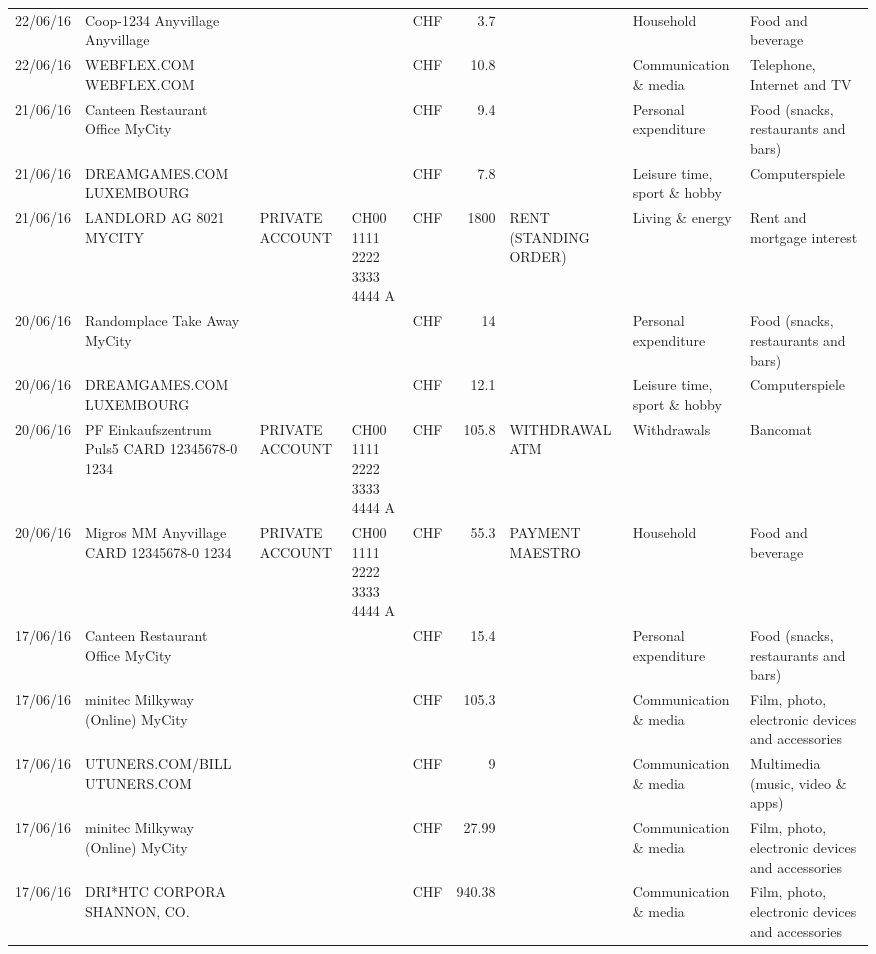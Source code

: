 \begin{landscape}
\begin{table}[h]
\begin{center}
\begin{tabular}{rllllrlll}
		22/06/16 & Coop-1234 Anyvillage    Anyvillage &       &       & CHF   & 3.7   &       & Household & Food and beverage \\
		22/06/16 & WEBFLEX.COM              WEBFLEX.COM &       &       & CHF   & 10.8  &       & Communication \& media & Telephone,  Internet and TV \\
		21/06/16 & Canteen Restaurant Office      MyCity &       &       & CHF   & 9.4   &       & Personal expenditure & Food (snacks, restaurants and bars) \\
		21/06/16 & DREAMGAMES.COM           LUXEMBOURG &       &       & CHF   & 7.8   &       & Leisure time, sport \& hobby & Computerspiele \\
		21/06/16 & LANDLORD AG 8021 MYCITY & PRIVATE ACCOUNT & CH00 1111 2222 3333 4444 A & CHF   & 1800  & RENT (STANDING ORDER) & Living \& energy & Rent and mortgage interest \\
		20/06/16 & Randomplace Take Away     MyCity &       &       & CHF   & 14    &       & Personal expenditure & Food (snacks, restaurants and bars) \\
		20/06/16 & DREAMGAMES.COM           LUXEMBOURG &       &       & CHF   & 12.1  &       & Leisure time, sport \& hobby & Computerspiele \\
		20/06/16 & PF Einkaufszentrum Puls5 CARD 12345678-0 1234 & PRIVATE ACCOUNT & CH00 1111 2222 3333 4444 A & CHF   & 105.8 & WITHDRAWAL ATM & Withdrawals & Bancomat \\
		20/06/16 & Migros MM Anyvillage CARD 12345678-0 1234 & PRIVATE ACCOUNT & CH00 1111 2222 3333 4444 A & CHF   & 55.3  & PAYMENT MAESTRO & Household & Food and beverage \\
		17/06/16 & Canteen Restaurant Office      MyCity &       &       & CHF   & 15.4  &       & Personal expenditure & Food (snacks, restaurants and bars) \\
		17/06/16 & minitec Milkyway (Online) MyCity &       &       & CHF   & 105.3 &       & Communication \& media & Film, photo, electronic devices and accessories \\
		17/06/16 & UTUNERS.COM/BILL          UTUNERS.COM &       &       & CHF   & 9     &       & Communication \& media & Multimedia (music, video \& apps) \\
		17/06/16 & minitec Milkyway (Online) MyCity &       &       & CHF   & 27.99 &       & Communication \& media & Film, photo, electronic devices and accessories \\
		17/06/16 & DRI*HTC CORPORA          SHANNON, CO. &       &       & CHF   & 940.38 &       & Communication \& media & Film, photo, electronic devices and accessories \\

\end{tabular}
\end{center}
\end{table}
\end{landscape}
